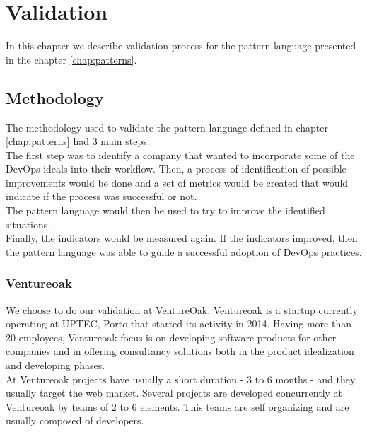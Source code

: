 \chapter{ Validation } \label{chap:validation}
In this chapter we describe validation process for the pattern language presented in the chapter \ref{chap:patterns}.

	\section{Methodology}
	The methodology used to validate the pattern language defined in chapter \ref{chap:patterns} had 3 main steps. \\
	The first step was to identify a company that wanted to incorporate some of the DevOps ideals into their workflow. Then, a process of identification of possible improvements would be done and a set of metrics would be created that would indicate if the process was successful or not. \\
	The pattern language would then be used to try to improve the identified situations. \\
	Finally, the indicators would be measured again. If the indicators improved, then the pattern language was able to guide a successful adoption of DevOps practices.
       \subsection{Ventureoak}
        We choose to do our validation at VentureOak.
        Ventureoak is a startup currently operating at UPTEC, Porto that started its activity in 2014. Having more than 20 employees, Ventureoak focus is on developing software products for other companies and in offering consultancy solutions both in the product idealization and developing phases. \\
        At Ventureoak projects have usually a short duration - 3 to 6 months - and they usually target the web market. Several projects are developed concurrently at Ventureoak by teams of 2 to 6 elements. This teams are self organizing and are usually composed of developers. \\
